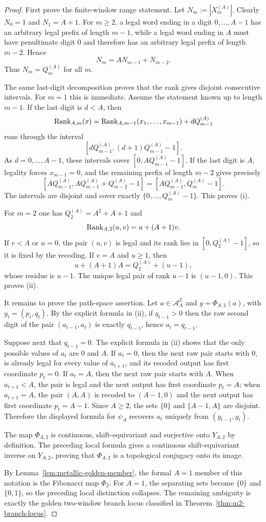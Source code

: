 \begin{proof}
First prove the finite-window range statement.  Let $N_m:=|X_m^{(A)}|$.
Clearly $N_0=1$ and $N_1=A+1$.  For $m\ge2$, a legal word ending in a digit
$0,\ldots,A-1$ has an arbitrary legal prefix of length $m-1$, while a legal
word ending in $A$ must have penultimate digit $0$ and therefore has an
arbitrary legal prefix of length $m-2$.  Hence
\[
N_m=A N_{m-1}+N_{m-2}.
\]
Thus $N_m=Q_m^{(A)}$ for all $m$.

The same last-digit decomposition proves that the rank gives disjoint
consecutive intervals. For $m=1$ this is immediate. Assume the statement
known up to length $m-1$. If the last digit is $d<A$, then
\[
\operatorname{Rank}_{A,m}(x)=\operatorname{Rank}_{A,m-1}(x_1,\ldots,x_{m-1})+dQ_{m-1}^{(A)}
\]
runs through the interval
\[
[dQ_{m-1}^{(A)},(d+1)Q_{m-1}^{(A)}-1].
\]
As $d=0,\ldots,A-1$, these intervals cover
$[0,AQ_{m-1}^{(A)}-1]$. If the last digit is $A$, legality forces
$x_{m-1}=0$, and the remaining prefix of length $m-2$ gives precisely
\[
[AQ_{m-1}^{(A)},AQ_{m-1}^{(A)}+Q_{m-2}^{(A)}-1]
=[AQ_{m-1}^{(A)},Q_m^{(A)}-1].
\]
The intervals are disjoint and cover exactly
$\{0,\ldots,Q_m^{(A)}-1\}$.  This proves (i).

For $m=2$ one has $Q_2^{(A)}=A^2+A+1$ and
\[
\operatorname{Rank}_{A,2}(u,v)=u+(A+1)v.
\]
If $v<A$ or $u=0$, the pair $(u,v)$ is legal and its rank lies in
$[0,Q_2^{(A)}-1]$, so it is fixed by the recoding.  If $v=A$ and $u\ge1$,
then
\[
u+(A+1)A=Q_2^{(A)}+(u-1),
\]
whose residue is $u-1$.  The unique legal pair of rank $u-1$ is
$(u-1,0)$.  This proves (ii).

It remains to prove the path-space assertion. Let
$a\in\mathcal A_A^{\mathbb Z}$ and $y=\Phi_{A,2}(a)$, with
$y_t=(p_t,q_t)$.  By the explicit formula in (ii), if $q_{t-1}>0$ then the
raw second digit of the pair $(a_{t-1},a_t)$ is exactly $q_{t-1}$, hence
$a_t=q_{t-1}$.

Suppose next that $q_{t-1}=0$.  The explicit formula in (ii) shows that the
only possible values of $a_t$ are $0$ and $A$.  If $a_t=0$, then the next raw
pair starts with $0$, is already legal for every value of $a_{t+1}$, and its
recoded output has first coordinate $p_t=0$.  If $a_t=A$, then the next raw
pair starts with $A$.  When $a_{t+1}<A$, the pair is legal and the next output
has first coordinate $p_t=A$; when $a_{t+1}=A$, the pair $(A,A)$ is recoded to
$(A-1,0)$ and the next output has first coordinate $p_t=A-1$.  Since
$A\ge2$, the sets $\{0\}$ and $\{A-1,A\}$ are disjoint.  Therefore the displayed
formula for $\psi_A$ recovers $a_t$ uniquely from $(y_{t-1},y_t)$.

The map $\Phi_{A,2}$ is continuous, shift-equivariant and surjective onto
$Y_{A,2}$ by definition. The preceding local formula gives a continuous
shift-equivariant inverse on $Y_{A,2}$, proving that $\Phi_{A,2}$ is a
topological conjugacy onto its image.

By Lemma~\ref{lem:metallic-golden-member}, the formal $A=1$ member of this
notation is the Fibonacci map $\Phi_2$.  For $A=1$, the separating sets become
$\{0\}$ and $\{0,1\}$, so the preceding local distinction collapses. The
remaining ambiguity is exactly the golden two-window branch locus classified
in Theorem~\ref{thm:m2-branch-locus}.
\end{proof}

